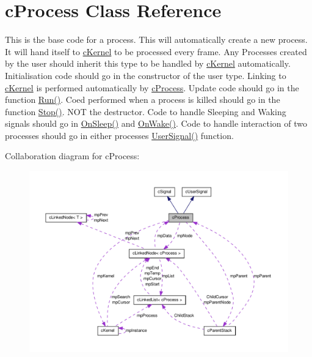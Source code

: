 \hypertarget{classc_process}{
\section{cProcess Class Reference}
\label{classc_process}
}


This is the base code for a process. This will automatically create a new process. It will hand itself to \hyperlink{classc_kernel}{cKernel} to be processed every frame. Any Processes created by the user should inherit this type to be handled by \hyperlink{classc_kernel}{cKernel} automatically. Initialisation code should go in the constructor of the user type. Linking to \hyperlink{classc_kernel}{cKernel} is performed automatically by \hyperlink{classc_process}{cProcess}. Update code should go in the function \hyperlink{classc_process_a3e0fab4ccc0a8fb065d50eb88b6a0dd5}{Run()}. Coed performed when a process is killed should go in the function \hyperlink{classc_process_ab967568c0892c868c5904d27a91072c7}{Stop()}. NOT the destructor. Code to handle Sleeping and Waking signals should go in \hyperlink{classc_process_ad9e66e8d1965e8974ef98121dc123bc5}{OnSleep()} and \hyperlink{classc_process_a5d5c0f3e58dbe50b7859394f16102257}{OnWake()}. Code to handle interaction of two processes should go in either processes \hyperlink{classc_process_a43924ae589dc673aac843af9da1410c7}{UserSignal()} function.  




Collaboration diagram for cProcess:\nopagebreak
\begin{figure}[H]
\begin{center}
\leavevmode
\includegraphics[width=400pt]{classc_process__coll__graph}
\end{center}
\end{figure}
